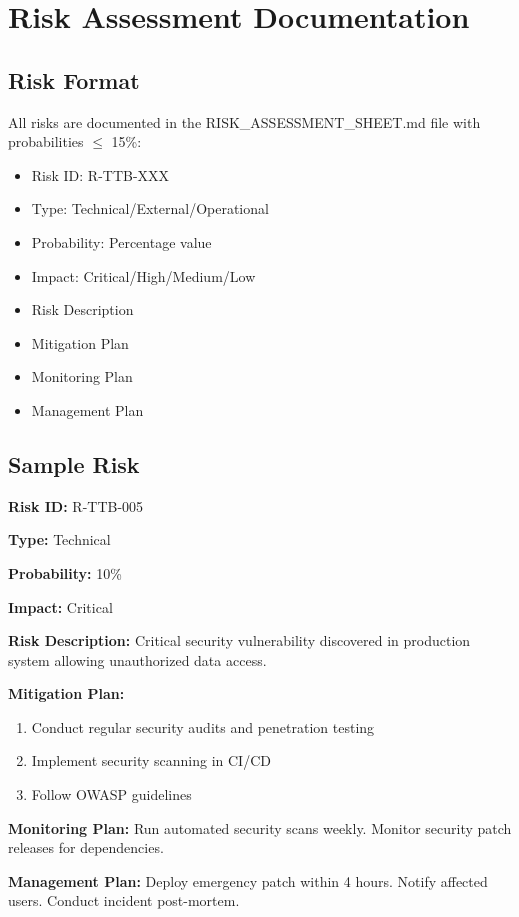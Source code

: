 \chapter{Risk Assessment Documentation}

\section{Risk Format}
All risks are documented in the RISK\_ASSESSMENT\_SHEET.md file with probabilities $\leq$ 15\%:
\begin{itemize}[leftmargin=*]
    \item Risk ID: R-TTB-XXX
    \item Type: Technical/External/Operational
    \item Probability: Percentage value
    \item Impact: Critical/High/Medium/Low
    \item Risk Description
    \item Mitigation Plan
    \item Monitoring Plan
    \item Management Plan
\end{itemize}

\section{Sample Risk}
\textbf{Risk ID:} R-TTB-005

\textbf{Type:} Technical

\textbf{Probability:} 10\%

\textbf{Impact:} Critical

\textbf{Risk Description:} Critical security vulnerability discovered in production system allowing unauthorized data access.

\textbf{Mitigation Plan:}
\begin{enumerate}
    \item Conduct regular security audits and penetration testing
    \item Implement security scanning in CI/CD
    \item Follow OWASP guidelines
\end{enumerate}

\textbf{Monitoring Plan:} Run automated security scans weekly. Monitor security patch releases for dependencies.

\textbf{Management Plan:} Deploy emergency patch within 4 hours. Notify affected users. Conduct incident post-mortem.
